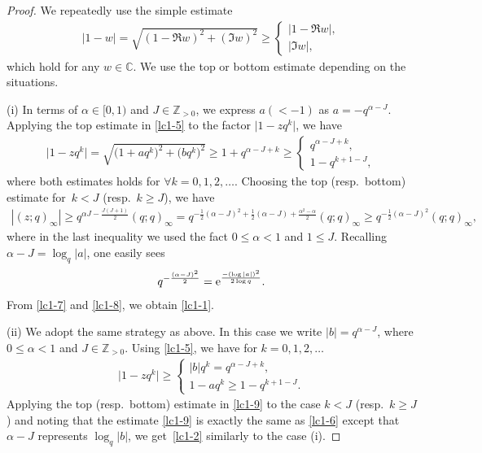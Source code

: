 \documentclass[pdftex]{sigma}
\numberwithin{equation}{section}
\def\a{\alpha}
\def\C{\mathbb{C}}
\def\i{\infty}
\def\Z{\mathbb{Z}}
\begin{document}
\begin{proof}
 We repeatedly use the simple estimate
 \begin{align}
\label{lc1-5}
 |1-w|=\sqrt{(1-\Re w)^2+(\Im w)^2}\ge
 \begin{cases}
 |1-\Re w|,\\
 |\Im w|,
 \end{cases}
\end{align}
 which hold for any $w\in\C$. We use the top or bottom estimate depending on the situations.

 (i) In terms of $\a\in [0,1)$ and $J\in\Z_{>0}$, we express $a(<-1)$
 as $a=-q^{\a-J}$.
 Applying the top estimate in \eqref{lc1-5}
 to the factor $\big|1-z q^k\big|$, we have
 \begin{align}
 \label{lc1-6}
 \big|1-z q^k\big|=\sqrt{\big(1+aq^{k}\big)^2+\big(bq^k\big)^2}
 \ge 1+q^{\a-J+k}
 \ge
 \begin{cases}
 q^{\a-J+k},
 \\
 1-q^{k+1-J},
 \end{cases}
 \end{align}
 where both estimates holds for $\forall k=0,1,2,\dots$. Choosing the top (resp.\ bottom) estimate for~${k<J}$ (resp.\ $k\ge J$), we have
 \begin{align}
 \label{lc1-7}
 |(z;q)_\i|\ge q^{\a J-\frac{J(J+1)}{2}}(q;q)_{\i}
 =
 q^{-\frac{1}{2}(\a-J)^2+\frac{1}{2}(\a-J)
 +\frac{\a^2-\a}{2}}(q;q)_{\i}
 \ge
 q^{-\frac{1}{2}(\a-J)^2}(q;q)_{\i},
 \end{align}
 where in the last inequality we used the fact
 $0\le\a<1$ and $1\le J$. Recalling $\a-J=\log_q|a|$,
 one easily sees
 \begin{align}
 \label{lc1-8}
 q^{-\frac{(\a-J)^2}{2}}=
 {\rm e}^{\frac{-(\log |a|)^2}{2\log q}}.
 \end{align}
 From \eqref{lc1-7} and \eqref{lc1-8},
 we obtain \eqref{lc1-1}.

 (ii)
 We adopt the same strategy as above.
 In this case we write $|b|=q^{\a-J}$, where
 $0\le \a<1$ and $J\in\Z_{>0}$. Using \eqref{lc1-5},
 we have for $k=0,1,2,\dots$
 \begin{align}
 \label{lc1-9}
 \big|1-z q^k\big|
 \ge
 \begin{cases}
 |b|q^{k}=q^{\a-J+k},
 \\
 1-aq^k\ge 1-q^{k+1-J}.
 \end{cases}
 \end{align}
 Applying the top (resp.\ bottom) estimate in \eqref{lc1-9} to the case $k<J$ (resp.\ $k\ge J$) and noting that the estimate \eqref{lc1-9}
 is exactly the same as \eqref{lc1-6} except
 that $\a-J$ represents $\log_q|b|$, we get~\eqref{lc1-2} similarly to the case
 (i).


\end{proof}
\end{document}
